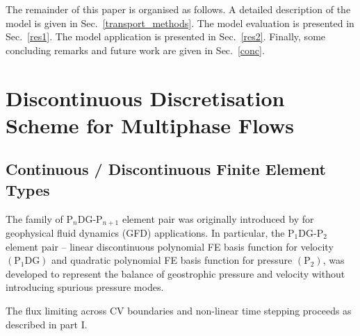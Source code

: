 \documentclass[preprint,authoryear,12pt]{elsarticle}
\begin{document}
The remainder of this paper is organised as follows. A detailed
description of the model is given in Sec.~\ref{transport_methods}. The
model evaluation is presented in Sec.~\ref{res1}. The model
application is presented in Sec.~\ref{res2}. Finally, some concluding
remarks and future work are given in Sec.~\ref{conc}.

\setlength\parindent{0pt}


\section{Discontinuous Discretisation Scheme for Multiphase Flows}
\subsection{Continuous / Discontinuous Finite Element Types} \label{element_types_section}
The family of P$_{n}$DG-P$_{n+1}$ element pair was originally
introduced by \citet{cotter_2009b} \citep[see
  also][]{cotter_2009a,cotter_2011} for geophysical fluid dynamics
(GFD) applications. In particular, the P$_{1}$DG-P$_{2}$ element pair
-- linear discontinuous polynomial FE basis function for velocity
$\left(\text{P}_{1}\text{DG}\right)$ and quadratic polynomial FE basis
function for pressure $\left(\text{P}_{2}\right)$, was developed to
represent the balance of geostrophic pressure and velocity without
introducing spurious pressure modes.

The flux limiting across CV boundaries and non-linear time stepping proceeds 
as described in part I. 
\end{document}

